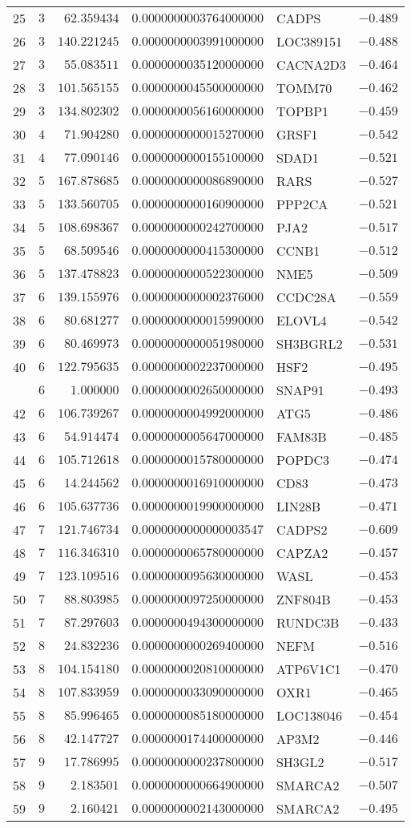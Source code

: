 {\begin{longtable}{lrrrlr}
25&$ 3$&$ 62.359434$&$0.0000000003764000000$&CADPS&$-0.489$\tabularnewline
26&$ 3$&$140.221245$&$0.0000000003991000000$&LOC389151&$-0.488$\tabularnewline
27&$ 3$&$ 55.083511$&$0.0000000035120000000$&CACNA2D3&$-0.464$\tabularnewline
28&$ 3$&$101.565155$&$0.0000000045500000000$&TOMM70&$-0.462$\tabularnewline
29&$ 3$&$134.802302$&$0.0000000056160000000$&TOPBP1&$-0.459$\tabularnewline
30&$ 4$&$ 71.904280$&$0.0000000000015270000$&GRSF1&$-0.542$\tabularnewline
31&$ 4$&$ 77.090146$&$0.0000000000155100000$&SDAD1&$-0.521$\tabularnewline
32&$ 5$&$167.878685$&$0.0000000000086890000$&RARS&$-0.527$\tabularnewline
33&$ 5$&$133.560705$&$0.0000000000160900000$&PPP2CA&$-0.521$\tabularnewline
34&$ 5$&$108.698367$&$0.0000000000242700000$&PJA2&$-0.517$\tabularnewline
35&$ 5$&$ 68.509546$&$0.0000000000415300000$&CCNB1&$-0.512$\tabularnewline
36&$ 5$&$137.478823$&$0.0000000000522300000$&NME5&$-0.509$\tabularnewline
37&$ 6$&$139.155976$&$0.0000000000002376000$&CCDC28A&$-0.559$\tabularnewline
38&$ 6$&$ 80.681277$&$0.0000000000015990000$&ELOVL4&$-0.542$\tabularnewline
39&$ 6$&$ 80.469973$&$0.0000000000051980000$&SH3BGRL2&$-0.531$\tabularnewline
40&$ 6$&$122.795635$&$0.0000000002237000000$&HSF2&$-0.495$\tabularnewline
\newpage
41&$ 6$&$  1.000000$&$0.0000000002650000000$&SNAP91&$-0.493$\tabularnewline
42&$ 6$&$106.739267$&$0.0000000004992000000$&ATG5&$-0.486$\tabularnewline
43&$ 6$&$ 54.914474$&$0.0000000005647000000$&FAM83B&$-0.485$\tabularnewline
44&$ 6$&$105.712618$&$0.0000000015780000000$&POPDC3&$-0.474$\tabularnewline
45&$ 6$&$ 14.244562$&$0.0000000016910000000$&CD83&$-0.473$\tabularnewline
46&$ 6$&$105.637736$&$0.0000000019900000000$&LIN28B&$-0.471$\tabularnewline
47&$ 7$&$121.746734$&$0.0000000000000003547$&CADPS2&$-0.609$\tabularnewline
48&$ 7$&$116.346310$&$0.0000000065780000000$&CAPZA2&$-0.457$\tabularnewline
49&$ 7$&$123.109516$&$0.0000000095630000000$&WASL&$-0.453$\tabularnewline
50&$ 7$&$ 88.803985$&$0.0000000097250000000$&ZNF804B&$-0.453$\tabularnewline
51&$ 7$&$ 87.297603$&$0.0000000494300000000$&RUNDC3B&$-0.433$\tabularnewline
52&$ 8$&$ 24.832236$&$0.0000000000269400000$&NEFM&$-0.516$\tabularnewline
53&$ 8$&$104.154180$&$0.0000000020810000000$&ATP6V1C1&$-0.470$\tabularnewline
54&$ 8$&$107.833959$&$0.0000000033090000000$&OXR1&$-0.465$\tabularnewline
55&$ 8$&$ 85.996465$&$0.0000000085180000000$&LOC138046&$-0.454$\tabularnewline
56&$ 8$&$ 42.147727$&$0.0000000174400000000$&AP3M2&$-0.446$\tabularnewline
57&$ 9$&$ 17.786995$&$0.0000000000237800000$&SH3GL2&$-0.517$\tabularnewline
58&$ 9$&$  2.183501$&$0.0000000000664900000$&SMARCA2&$-0.507$\tabularnewline
59&$ 9$&$  2.160421$&$0.0000000002143000000$&SMARCA2&$-0.495$\tabularnewline

\end{longtable}}
